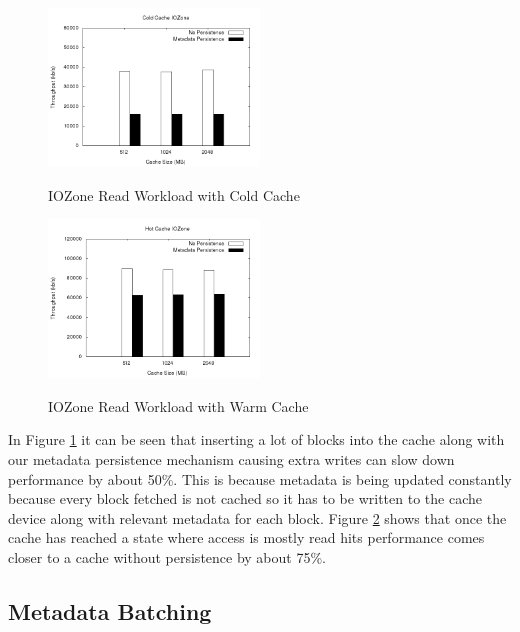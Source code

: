 \graphicspath{{../Results/}}

\begin{figure}[t]
  \caption{IOZone Read Workload with Cold Cache}
  \centering \includegraphics[width=0.5\textwidth]{results_first.png}
  \label{fig:iozone-cold}
\end{figure}

\begin{figure}[t]
  \caption{IOZone Read Workload with Warm Cache}
  \centering \includegraphics[width=0.5\textwidth]{results_second.png}
  \label{fig:iozone-warm}
\end{figure}

In Figure \ref{fig:iozone-cold} it can be seen that inserting a lot of
blocks into the cache along with our metadata persistence mechanism
causing extra writes can slow down performance by about 50\%. This is
because metadata is being updated constantly because every block
fetched is not cached so it has to be written to the cache device
along with relevant metadata for each block. Figure
\ref{fig:iozone-warm} shows that once the cache has reached a state
where access is mostly read hits performance comes closer to a cache
without persistence by about 75\%.

\subsection{Metadata Batching}

